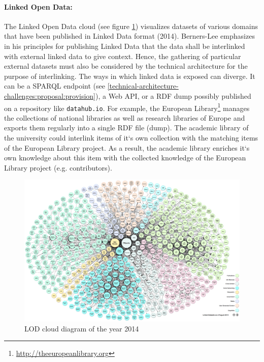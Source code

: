 \documentclass{article}
\begin{document}
\paragraph{Linked Open Data:} The Linked Open Data cloud (see figure \ref{fig:lod-cloud-diagram}) visualizes datasets of various domains that have been published in Linked Data format (2014)\cite{_linking_????}. Berners-Lee emphasizes in his principles for publishing Linked Data that the data shall be interlinked with external linked data to give context. Hence, the gathering of particular external datasets must also be considered by the technical architecture for the purpose of interlinking. The ways in which linked data is exposed can diverge. It can be a SPARQL endpoint (see \ref{technical-architecture-challenges:proposal:provision}), a Web API, or a RDF dump possibly published on a repository like \texttt{datahub.io}. For example, the European Library\footnote{\url{http://theeuropeanlibrary.org}} manages the collections of national libraries as well as research libraries of Europe and exports them regularly into a single RDF file (dump). The academic library of the university could interlink items of it`s own collection with the matching items of the European Library project. As a result, the academic library enriches it`s own knowledge about this item with the collected knowledge of the European Library project (e.g. contributors). 

\begin{figure}[t]
\centering \includegraphics*[width=1.0\columnwidth]{images/technical-architecture/lod-cloud_colored_1000px.png}
\caption{LOD cloud diagram of the year 2014}
\label{fig:lod-cloud-diagram}
\end{figure}
\end{document}

